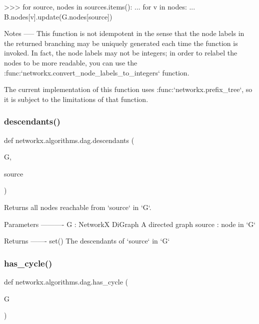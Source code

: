 \begin{DoxyVerb}
    >>> for source, nodes in sources.items():
    ...     for v in nodes:
    ...         B.nodes[v].update(G.nodes[source])

Notes
-----
This function is not idempotent in the sense that the node labels in
the returned branching may be uniquely generated each time the
function is invoked. In fact, the node labels may not be integers;
in order to relabel the nodes to be more readable, you can use the
:func:`networkx.convert_node_labels_to_integers` function.

The current implementation of this function uses
:func:`networkx.prefix_tree`, so it is subject to the limitations of
that function.\end{DoxyVerb}
 \mbox{\label{namespacenetworkx_1_1algorithms_1_1dag_ad83d7e1164190f67e4f648e8bb0d1df8}} 
\subsubsection{\texorpdfstring{descendants()}{descendants()}}
{\footnotesize\ttfamily def networkx.\+algorithms.\+dag.\+descendants (\begin{DoxyParamCaption}\item[{}]{G,  }\item[{}]{source }\end{DoxyParamCaption})}

\begin{DoxyVerb}Returns all nodes reachable from `source` in `G`.

Parameters
----------
G : NetworkX DiGraph
    A directed graph
source : node in `G`

Returns
-------
set()
    The descendants of `source` in `G`
\end{DoxyVerb}
 \mbox{\label{namespacenetworkx_1_1algorithms_1_1dag_a92320d5ff79b60e340b1b386a71b5b33}} 
\subsubsection{\texorpdfstring{has\+\_\+cycle()}{has\_cycle()}}
{\footnotesize\ttfamily def networkx.\+algorithms.\+dag.\+has\+\_\+cycle (\begin{DoxyParamCaption}\item[{}]{G }\end{DoxyParamCaption})}

